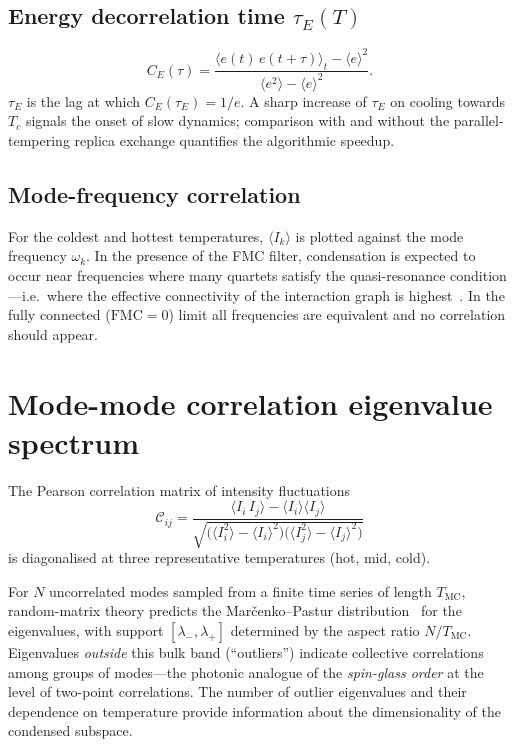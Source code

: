\documentclass[11pt,a4paper]{article}
\newcommand{\avg}[1]{\langle #1 \rangle}
\begin{document}
\subsection{Energy decorrelation time $\tau_E(T)$}
\begin{equation}
  C_E(\tau) = \frac{\avg{e(t)\,e(t+\tau)}_t - \avg{e}^2}{\avg{e^2} - \avg{e}^2}.
\end{equation}
$\tau_E$ is the lag at which $C_E(\tau_E) = 1/e$.
A sharp increase of $\tau_E$ on cooling towards $T_c$
signals the onset of slow dynamics; comparison with and
without the parallel-tempering replica exchange quantifies
the algorithmic speedup.

\subsection{Mode-frequency correlation}
For the coldest and hottest temperatures, $\avg{I_k}$ is
plotted against the mode frequency $\omega_k$.  In the
presence of the FMC filter, condensation is expected to occur
near frequencies where many quartets satisfy the
quasi-resonance condition---i.e.\ where the effective
connectivity of the interaction graph is
highest~\cite{Antenucci2015a,Antenucci2015b}.  In the
fully connected ($\mathrm{FMC}=0$) limit all frequencies are
equivalent and no correlation should appear.

\section{Mode-mode correlation eigenvalue spectrum}

The Pearson correlation matrix of intensity fluctuations
\begin{equation}
  \mathcal{C}_{ij}
  = \frac{\avg{I_i\,I_j} - \avg{I_i}\avg{I_j}}
         {\sqrt{\bigl(\avg{I_i^2}-\avg{I_i}^2\bigr)
                \bigl(\avg{I_j^2}-\avg{I_j}^2\bigr)}}
\end{equation}
is diagonalised at three representative temperatures
(hot, mid, cold).

For $N$ uncorrelated modes sampled from a finite time series
of length $T_{\mathrm{MC}}$, random-matrix theory predicts the
Mar\v{c}enko--Pastur distribution~\cite{MarcenkoPastur1967}
for the eigenvalues, with support
$[\lambda_-, \lambda_+]$ determined by the aspect ratio
$N/T_{\mathrm{MC}}$.
Eigenvalues \emph{outside} this bulk band (``outliers'') indicate
collective correlations among groups of modes---the photonic
analogue of the \emph{spin-glass order} at the level of
two-point correlations.  The number of outlier eigenvalues and
their dependence on temperature provide information about the
dimensionality of the condensed subspace.
\end{document}
